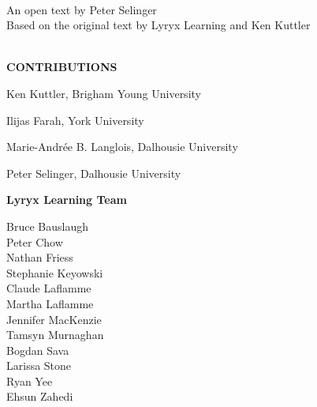 \thispagestyle{plain}

\begin{center}
  {\fontsize{24pt}{22pt}\selectfont \textcolor{titletextcolour}{\booksubtitle\;\booktitle}} \\
  \bigskip
  {\fontsize{18pt}{20pt}\selectfont An open text by Peter Selinger} \\
  \bigskip
  {\fontsize{16pt}{20pt}\selectfont Based on the original text by Lyryx Learning and Ken Kuttler} \\
  \bigskip
  {\fontsize{16pt}{20pt}\selectfont \edition} \\
\end{center}

\setlength{\parskip}{0pt}

\vfill

\begin{center}
  \fontsize{14pt}{16pt}\selectfont\textcolor{titletextcolour}{\textbf{CONTRIBUTIONS}}
\end{center}

{\small

  \begin{center}
    Ken Kuttler, Brigham Young University
    \bigskip

    Ilijas Farah, York University
    \smallskip

    Marie-Andr\'ee B. Langlois, Dalhousie University
    \smallskip

    Peter Selinger, Dalhousie University

    \bigskip
    \textbf{Lyryx Learning Team}
    \vspace{-1em}

    \begin{multicols}{2}
      Bruce Bauslaugh \\
      Peter Chow \\
      Nathan Friess \\
      Stephanie Keyowski \\
      Claude Laflamme \\
      Martha Laflamme \\
      Jennifer MacKenzie \\
      Tamsyn Murnaghan \\
      Bogdan Sava \\
      Larissa Stone \\
      Ryan Yee \\
      Ehsun Zahedi \\
    \end{multicols}

  \end{center}

}


